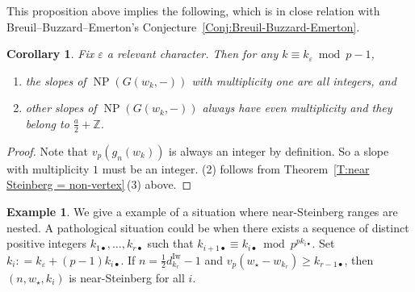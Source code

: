 \documentclass[12pt]{amsart}
\newtheorem{corollary}[subsection]{Corollary}
\theoremstyle{definition}
\newtheorem{example}[subsection]{Example}
\numberwithin{equation}{subsection}
\def\ZZ{\mathbb{Z}}
\DeclareMathOperator{\NP}{NP}
\newcommand{\Iw}{\mathrm{Iw}}
\begin{document}
This proposition above implies the following, which is in close relation with Breuil--Buzzard--Emerton's Conjecture~\ref{Conj:Breuil-Buzzard-Emerton}.
\begin{corollary}
\label{C:integrality of slopes of G}
Fix $\varepsilon$ a relevant character. Then for any $k \equiv k_\varepsilon  \bmod p-1$, 
\begin{enumerate}
\item the slopes of $\NP(G(w_k, - ))$ with multiplicity one are all integers, and
\item 
other slopes of $\NP(G(w_k, - ))$ always have even multiplicity and they belong to $\frac a2 +\ZZ$.
\end{enumerate}
\end{corollary}
\begin{proof}
Note that $v_p(g_n(w_k))$ is always an integer by definition. So a slope with multiplicity $1$ must be an integer. (2) follows from Theorem~\ref{T:near Steinberg = non-vertex}\,(3) above.
\end{proof}

\begin{example}
\label{Ex:pathological Steinberg range}
We give a example of a situation where near-Steinberg ranges are nested. 
A pathological situation could be when there exists a sequence of distinct positive integers $k_{1\bullet},\dots, k_{r\bullet}$ such that $k_{{i+1}\bullet} \equiv k_{i\bullet} \bmod{p^{pk_{i\bullet}}}$. Set $k_i: =k_\varepsilon + (p-1)k_{i\bullet}$. If $n = \frac 12 d_{k_r}^\Iw-1$ and $v_p(w_\star - w_{k_r}) \geq k_{r-1\bullet}$, then $(n,w_\star, k_i)$ is near-Steinberg for all $i$.
\end{example}
\end{document}
